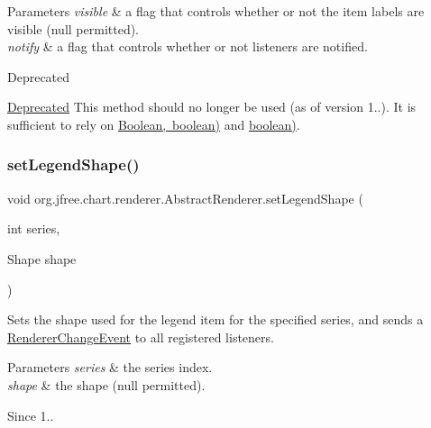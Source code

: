 \begin{DoxyParams}{Parameters}
{\em visible} & a flag that controls whether or not the item labels are visible ({\ttfamily null} permitted). \\
\hline
{\em notify} & a flag that controls whether or not listeners are notified.\\
\hline
\end{DoxyParams}
\begin{DoxyRefDesc}{Deprecated}
\item[\mbox{\hyperlink{deprecated__deprecated000130}{Deprecated}}]This method should no longer be used (as of version 1..). It is sufficient to rely on \mbox{\hyperlink{}{Boolean, boolean)}} and \mbox{\hyperlink{classorg_1_1jfree_1_1chart_1_1renderer_1_1_abstract_renderer_ab9850c8c551535e4f5557853d505ac15}{boolean)}}. \end{DoxyRefDesc}
\mbox{\label{classorg_1_1jfree_1_1chart_1_1renderer_1_1_abstract_renderer_a2482ff12a9196057ae7bb7e3e83217d3}} 
\subsubsection{\texorpdfstring{set\+Legend\+Shape()}{setLegendShape()}}
{\footnotesize\ttfamily void org.\+jfree.\+chart.\+renderer.\+Abstract\+Renderer.\+set\+Legend\+Shape (\begin{DoxyParamCaption}\item[{int}]{series,  }\item[{Shape}]{shape }\end{DoxyParamCaption})}

Sets the shape used for the legend item for the specified series, and sends a \mbox{\hyperlink{}{Renderer\+Change\+Event}} to all registered listeners.


\begin{DoxyParams}{Parameters}
{\em series} & the series index. \\
\hline
{\em shape} & the shape ({\ttfamily null} permitted).\\
\hline
\end{DoxyParams}
\begin{DoxySince}{Since}
1.. 
\end{DoxySince}
\mbox{\label{classorg_1_1jfree_1_1chart_1_1renderer_1_1_abstract_renderer_ab991a17b7b53153f0e044b7a6fbc00ac}} 
